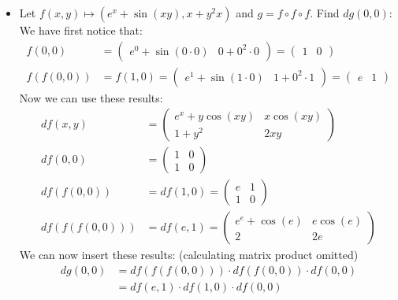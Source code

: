 \documentclass[25pt]{sciposter}
\begin{document}
\begin{multicols}{3}
\begin{itemize}
	\item Let $f(x,y)\mapsto (e^x + \sin(xy), x+y^2x)$ and $g = f\circ f \circ f$. Find $dg(0,0)$: We have first notice that:
	\begin{align*}
		f(0,0) &= \begin{pmatrix}
		e^0 + \sin(0\cdot 0) & 0 + 0^2\cdot 0
		\end{pmatrix} = \begin{pmatrix}
		1 & 0
		\end{pmatrix}\\
		f(f(0,0)) &= f(1,0) = \begin{pmatrix}
		e^1 + \sin(1\cdot 0) & 1 + 0^2\cdot 1
		\end{pmatrix} = \begin{pmatrix}
		e & 1
		\end{pmatrix}
	\end{align*}
	Now we can use these results:
	\begin{align*}
		df(x,y) &= \begin{pmatrix}
		e^{x} + y\cos(xy) & x\cos(xy) \\1+y^2 & 2xy
		\end{pmatrix}\\
		df(0,0) &= \begin{pmatrix} 1 & 0 \\ 1 & 0
		\end{pmatrix}\\
		df(f(0,0)) &= df(1,0) = \begin{pmatrix}
		e & 1 \\ 1& 0
		\end{pmatrix}\\
		df(f(f(0,0))) &= df(e,1) =  \begin{pmatrix}
		e^e + \cos(e) & e\cos(e) \\ 2 & 2e
		\end{pmatrix}
	\end{align*}
	We can now insert these results: (calculating matrix product omitted)
	\begin{align*}
		dg(0,0) &= df(f(f(0,0)))\cdot df(f(0,0)) \cdot df(0,0) \\
		&= df(e,1) \cdot df(1,0)\cdot df(0,0)
	\end{align*}
\end{itemize}


\end{multicols}
\end{document}
